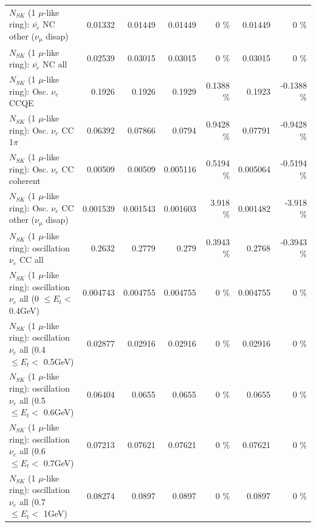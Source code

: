 \begin{table}
\begin{tabular}{| l | r | r | r  r | r  r |}
          $N_{SK}$ (1 $\mu$-like ring): $\bar{\nu_e}$ NC other ($\nu_\mu$ disap) &         0.01332 &         0.01449 &         0.01449 &        0 \%  &         0.01449 &        0 \%  \\ 
                            $N_{SK}$ (1 $\mu$-like ring): $\bar{\nu_{e}}$ NC all &         0.02539 &         0.03015 &         0.03015 &        0 \%  &         0.03015 &        0 \%  \\ 
\hline
\hline
\hline
                                 $N_{SK}$ (1 $\mu$-like ring): Osc. $\nu_e$ CCQE &          0.1926 &          0.1926 &          0.1929 &   0.1388 \%  &          0.1923 &  -0.1388 \%  \\ 
                            $N_{SK}$ (1 $\mu$-like ring): Osc. $\nu_e$ CC 1$\pi$ &         0.06392 &         0.07866 &          0.0794 &   0.9428 \%  &         0.07791 &  -0.9428 \%  \\ 
                          $N_{SK}$ (1 $\mu$-like ring): Osc. $\nu_e$ CC coherent &         0.00509 &         0.00509 &        0.005116 &   0.5194 \%  &        0.005064 &  -0.5194 \%  \\ 
           $N_{SK}$ (1 $\mu$-like ring): Osc. $\nu_e$ CC other ($\nu_\mu$ disap) &        0.001539 &        0.001543 &        0.001603 &    3.918 \%  &        0.001482 &   -3.918 \%  \\ 
                        $N_{SK}$ (1 $\mu$-like ring): oscillation $\nu_e$ CC all &          0.2632 &          0.2779 &           0.279 &   0.3943 \%  &          0.2768 &  -0.3943 \%  \\ 
\hline
$N_{SK}$ (1 $\mu$-like ring): oscillation $\nu_{e}$ all (0 $\leq E_{t} <$ 0.4GeV) &        0.004743 &        0.004755 &        0.004755 &        0 \%  &        0.004755 &        0 \%  \\ 
$N_{SK}$ (1 $\mu$-like ring): oscillation $\nu_{e}$ all (0.4 $\leq E_{t} <$ 0.5GeV) &         0.02877 &         0.02916 &         0.02916 &        0 \%  &         0.02916 &        0 \%  \\ 
$N_{SK}$ (1 $\mu$-like ring): oscillation $\nu_{e}$ all (0.5 $\leq E_{t} <$ 0.6GeV) &         0.06404 &          0.0655 &          0.0655 &        0 \%  &          0.0655 &        0 \%  \\ 
$N_{SK}$ (1 $\mu$-like ring): oscillation $\nu_{e}$ all (0.6 $\leq E_{t} <$ 0.7GeV) &         0.07213 &         0.07621 &         0.07621 &        0 \%  &         0.07621 &        0 \%  \\ 
$N_{SK}$ (1 $\mu$-like ring): oscillation $\nu_{e}$ all (0.7 $\leq E_{t} <$ 1GeV) &         0.08274 &          0.0897 &          0.0897 &        0 \%  &          0.0897 &        0 \%  \\ 

\end{tabular}
\end{table}
